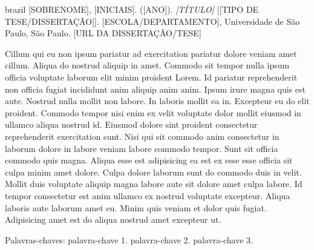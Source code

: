\documentclass[
  12pt,
  a4paper,
  oneside]{tesesusp}
\renewcommand*\listfigurename{List of Figures}
\newcommand\listfigurename{List of Figures}
\begin{document}

\begin{resumo}[RESUMO]
  \begin{otherlanguage*}{brazil}
{[}SOBRENOME{]}, {[}INICIAIS{]}. ({[}ANO{]}). \emph{{[}TÍTULO{]}}
{[}{[}TIPO DE TESE/DISSERTAÇÃO{]}{]}. {[}ESCOLA/DEPARTAMENTO{]},
Universidade de São Paulo, São Paulo. {[}URL DA DISSERTAÇÃO/TESE{]}

Cillum qui eu non ipsum pariatur ad exercitation pariatur dolore veniam
amet cillum. Aliqua do nostrud aliquip in amet. Commodo sit tempor nulla
ipsum officia voluptate laborum elit minim proident Lorem. Id pariatur
reprehenderit non officia fugiat incididunt anim aliquip anim anim.
Ipsum irure magna quis est aute. Nostrud nulla mollit non labore. In
laboris mollit ea in. Excepteur eu do elit proident. Commodo tempor nisi
enim ex velit voluptate dolor mollit eiusmod in ullamco aliqua nostrud
id. Eiusmod dolore sint proident consectetur reprehenderit exercitation
sunt. Nisi qui sit commodo anim consectetur in laborum dolore in labore
veniam labore commodo tempor. Sunt sit officia commodo quis magna.
Aliqua esse est adipisicing ea est ex esse esse officia sit culpa minim
amet dolore. Culpa dolore laborum sunt do commodo duis in velit. Mollit
duis voluptate aliquip magna labore aute sit dolore amet culpa labore.
Id tempor consectetur est anim ullamco ex nostrud voluptate excepteur.
Aliqua laboris aute laborum amet eu. Minim quis veniam et dolor quis
fugiat. Adipisicing amet est do aliqua nostrud amet excepteur ut.

Palavras-chaves: palavra-chave 1. palavra-chave 2. palavra-chave 3.
  \end{otherlanguage*}
\end{resumo}


\renewcommand{\listfigurename}{LIST OF FIGURES}
\pdfbookmark[0]{\listfigurename}{lof}
\listoffigures*
\cleardoublepage
\end{document}
